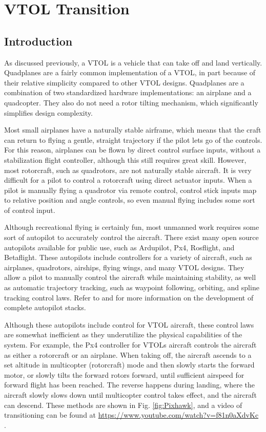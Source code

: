 \chapter{VTOL Transition}
\label{ch:VTOL}

\section{Introduction}

As discussed previously, a VTOL is a vehicle that can take off and land vertically.
Quadplanes are a fairly common implementation of a VTOL, in part because of their relative simplicity compared to other VTOL designs.
Quadplanes are a combination of two standardized hardware implementations: an airplane and a quadcopter.
They also do not need a rotor tilting mechanism, which significantly simplifies design complexity.

Most small airplanes have a naturally stable airframe, which means that the craft can return to flying a gentle, straight trajectory if the pilot lets go of the controls.
For this reason, airplanes can be flown by direct control surface inputs, without a stabilization flight controller, although this still requires great skill.
However, most rotorcraft, such as quadrotors, are not naturally stable aircraft.
It is very difficult for a pilot to control a rotorcraft using direct actuator inputs. 
When a pilot is manually flying a quadrotor via remote control, control stick inputs map to relative position and angle controls, so even manual flying includes some sort of control input.

Although recreational flying is certainly fun, most unmanned work requires some sort of autopilot to accurately control the aircraft.
There exist many open source autopilots available for public use, such as Ardupilot, Px4, Rosflight, and Betaflight.
These autopilots include controllers for a variety of aircraft, such as airplanes, quadrotors, airships, flying wings, and many VTOL designs.
They allow a pilot to manually control the aircraft while maintaining stability, as well as automatic trajectory tracking, such as waypoint following, orbiting, and spline tracking control laws.
Refer to \cite{uav_book} and \cite{vtol_book} for more information on the development of complete autopilot stacks.

Although these autopilots include control for VTOL aircraft, these control laws are somewhat inefficient as they underutilize the physical capabilities of the system.
For example, the Px4 controller for VTOLs aircraft controls the aircraft as either a rotorcraft or an airplane.
When taking off, the aircraft ascends to a set altitude in multicopter (rotorcraft) mode and then slowly starts the forward motor, or slowly tilts the forward rotors forward, until sufficient airspeed for forward flight has been reached. 
The reverse happens during landing, where the aircraft slowly slows down until multicopter control takes effect, and the aircraft can descend.
These methods are shown in Fig. \ref{fig:Pixhawk}, and a video of transitioning can be found at \href{https://www.youtube.com/watch?v=f81n0aXdvKc}{https://www.youtube.com/watch?v=f81n0aXdvKc} \cite{transition_video}.

